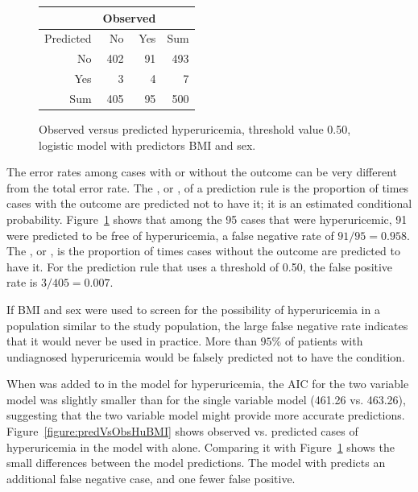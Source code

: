 \begin{figure}[ht]
\centering
\begin{tabular}{rrrr}
  \hline
  & \multicolumn{2}{c}{Observed} & \\
  \hline
 Predicted& No & Yes & Sum \\ 
  \hline
No & 402 & 91 & 493 \\ 
Yes & 3 & 4 & 7 \\ 
  Sum & 405 & 95 & 500 \\ 
   \hline
\end{tabular}
\caption{Observed versus predicted hyperuricemia, 
       threshold value 0.50, logistic model with predictors BMI and sex.} 
\label{figure:predVsObsHuBMISex}
\end{figure}

The error rates among cases with or without the outcome can be very different from the total error rate. The , or , of a prediction rule is the proportion of times cases with the outcome are predicted not to have it; it is an estimated conditional probability.  Figure~\ref{figure:predVsObsHuBMISex} shows that among the 95 cases that were hyperuricemic, 91 were predicted to be free of hyperuricemia, a false negative rate of $91/95 = 0.958$. The , or , is the proportion of times cases without the outcome are predicted to have it. For the prediction rule that uses a threshold of 0.50, the false positive rate is $3/405 = 0.007$.   

If BMI and sex were used to screen for the possibility of hyperuricemia in a population similar to the study population, the large false negative rate indicates that it would never be used in practice.  More than $95\%$ of patients with undiagnosed hyperuricemia would be falsely predicted not to have the condition.

When  was added to  in the model for hyperuricemia, the AIC for the two variable model was slightly smaller than for the single variable model (461.26 vs. 463.26), suggesting that the two variable model might provide more accurate predictions.  Figure~\ref{figure:predVsObsHuBMI} shows observed vs. predicted cases of hyperuricemia in the model with  alone.  Comparing it with Figure~\ref{figure:predVsObsHuBMISex} shows the small differences between the model predictions. The model with  predicts an additional false negative case, and one fewer false positive. 

